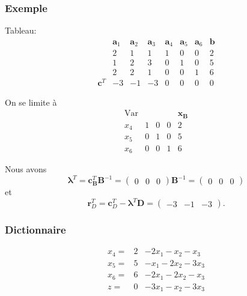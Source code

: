 \documentclass[usepdftitle=false]{beamer}
\def\ba{\boldsymbol{a}}
\def\bb{\boldsymbol{b}}
\def\bc{\boldsymbol{c}}
\def\br{\boldsymbol{r}}
\def\bx{\boldsymbol{x}}
\def\bB{\boldsymbol{B}}
\def\bD{\boldsymbol{D}}
\def\blambda{\boldsymbol{\lambda}}
\begin{document}
\begin{frame}
\frametitle{Exemple}

Tableau:
\[
\begin{matrix}
& \ba_1 & \ba_2 & \ba_3 & \ba_4 & \ba_5 & \ba_6 & \bb \\
& 2 & 1 & 1 & 1 & 0 & 0 & 2 \\
& 1 & 2 & 3 & 0 & 1 & 0 & 5 \\
& 2 & 2 & 1 & 0 & 0 & 1 & 6 \\
\bc^T & -3 & -1 & -3 & 0 & 0 & 0 & 0
\end{matrix}
\]

\mbox{}

On se limite à
\[
\begin{matrix}
\mbox{Var} & & & & \bx_{\bB} \\
x_4 & 1 & 0 & 0 & 2 \\
x_5 & 0 & 1 & 0 & 5 \\
x_6 & 0 & 0 & 1 & 6
\end{matrix}
\]

\mbox{}

Nous avons
\[
\blambda^T = \bc_ {\bB}^T \bB^{-1} = \begin{pmatrix} 0 & 0 & 0 \end{pmatrix}\bB^{-1} =
 \begin{pmatrix} 0 & 0 & 0 \end{pmatrix}
\]
et
\[
\br_D^T = \bc_D^T - \blambda^T\bD =  \begin{pmatrix} -3 & -1 & -3 \end{pmatrix}.
\]

\end{frame}

\begin{frame}
\frametitle{Dictionnaire}

\[
\begin{matrix}
x_4 = & 2 & - 2 x_1 - x_2 - x_3 \\
x_5 = & 5 & - x_1 - 2 x_2 - 3 x_3 \\
x_6 = & 6 & - 2 x_1 - 2 x_2 - x_3 \\
\hline
z = & 0 & - 3x_1 - x_2 - 3 x_3
\end{matrix}
\]

\end{frame}
\end{document}
